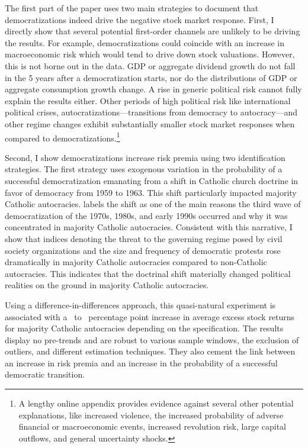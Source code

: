 The first part of the paper uses two main strategies to document that democratizations indeed drive the negative stock market response.  First, I directly show that several potential first-order channels are unlikely to be driving the results.  For example, democratizations could coincide with an increase in macroeconomic risk which would tend to drive down stock valuations. However, this is not borne out in the data. GDP or aggregate dividend growth do not fall in the 5 years after a democratization starts, nor do the distributions of GDP or aggregate consumption growth change.  A rise in generic political risk cannot fully explain the results either. Other periods of high political risk like international political crises, autocratizations---transitions from democracy to autocracy---and other regime changes exhibit substantially smaller stock market responses when compared to democratizations.\footnote{A lengthy online appendix provides evidence against several other potential explanations, like increased violence, the increased probability of adverse financial or macroeconomic events, increased revolution risk, large capital outflows, and general uncertainty shocks.}

Second, I show democratizations increase risk premia using two identification strategies.  The first strategy uses exogenous variation in the probability of a successful democratization emanating from a shift in Catholic church doctrine in favor of democracy from 1959 to 1963. This shift particularly impacted majority Catholic autocracies. \cite{Huntington1991} labels the shift as one of the main reasons the third wave of democratization of the 1970s, 1980s, and early 1990s occurred and why it was concentrated in majority Catholic autocracies. Consistent with this narrative,  I show that indices denoting the threat to the governing regime posed by civil society organizations and the size and frequency of democratic protests rose dramatically in majority Catholic autocracies compared to non-Catholic autocracies. This indicates that the doctrinal shift materially changed political realities on the ground in majority Catholic autocracies. 

Using a difference-in-differences approach, this quasi-natural experiment is associated with a \tabSevenLow\ to \tabSevenHigh\ percentage point increase in average excess stock returns for majority Catholic autocracies depending on the specification. The results display no pre-trends and are robust to various sample windows, the exclusion of outliers, and different estimation techniques. They also cement the link between an increase in risk premia and an increase in the probability of a successful democratic transition.

